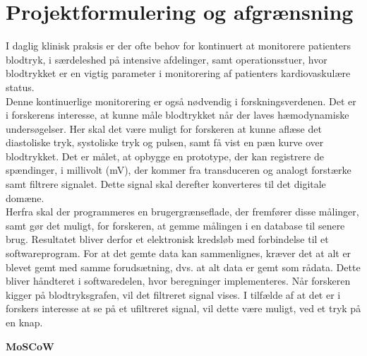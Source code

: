 \chapter{Projektformulering og afgrænsning}
I daglig klinisk praksis er der ofte behov for kontinuert at monitorere patienters blodtryk, i særdeleshed på intensive afdelinger, samt operationsstuer, hvor blodtrykket er en vigtig parameter i monitorering af patienters kardiovaskulære status.\\
Denne kontinuerlige monitorering er også nødvendig i forskningsverdenen. Det er i forskerens interesse, at kunne måle blodtrykket når der laves hæmodynamiske undersøgelser. Her skal det være muligt for forskeren at kunne aflæse det diastoliske tryk, systoliske tryk og pulsen, samt få vist en pæn kurve over blodtrykket. Det er målet, at opbygge en prototype, der kan registrere de spændinger, i millivolt (mV), der kommer fra transduceren og analogt forstærke samt filtrere signalet. Dette signal skal derefter konverteres til det digitale domæne. \\
Herfra skal der programmeres en brugergrænseflade, der fremfører disse målinger, samt gør det muligt, for forskeren, at gemme målingen i en database til senere brug. Resultatet bliver derfor et elektronisk kredsløb med forbindelse til et softwareprogram.
For at det gemte data kan sammenlignes, kræver det at alt er blevet gemt med samme forudsætning, dvs. at alt data er gemt som rådata. Dette bliver håndteret i softwaredelen, hvor beregninger implementeres. Når forskeren kigger på blodtryksgrafen, vil det filtreret signal vises. I tilfælde af at det er i forskers interesse at se på et ufiltreret signal, vil dette være muligt, ved et tryk på en knap.

\textbf{MoSCoW }

